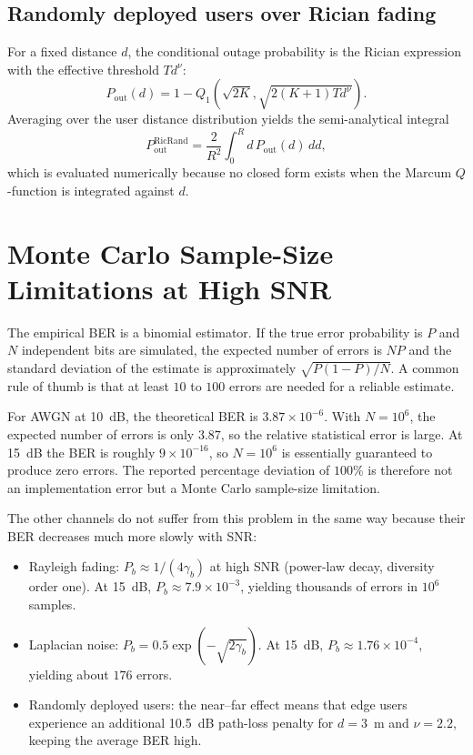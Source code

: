 \documentclass[12pt,a4paper]{article}
\begin{document}
\subsection{Randomly deployed users over Rician fading}
For a fixed distance $d$, the conditional outage probability is the Rician expression with the effective threshold $Td^{\nu}$:
\begin{equation}
    P_{\text{out}}(d)=1-Q_1\!\left(\sqrt{2K},\sqrt{2(K+1)Td^{\nu}}\right).
\end{equation}
Averaging over the user distance distribution yields the semi-analytical integral
\begin{equation}
    P_{\text{out}}^{\text{RicRand}}
    =\frac{2}{R^2}\int_0^R d\,P_{\text{out}}(d)\,dd,
\end{equation}
which is evaluated numerically because no closed form exists when the Marcum $Q$-function is integrated against $d$.

\section{Monte Carlo Sample-Size Limitations at High SNR}\label{app:sample}
The empirical BER is a binomial estimator. If the true error probability is $P$ and $N$ independent bits are simulated, the expected number of errors is $NP$ and the standard deviation of the estimate is approximately $\sqrt{P(1-P)/N}$. A common rule of thumb is that at least $10$ to $100$ errors are needed for a reliable estimate.

For AWGN at \SI{10}{dB}, the theoretical BER is $3.87\times 10^{-6}$. With $N=10^6$, the expected number of errors is only $3.87$, so the relative statistical error is large. At \SI{15}{dB} the BER is roughly $9\times 10^{-16}$, so $N=10^6$ is essentially guaranteed to produce zero errors. The reported percentage deviation of $100\%$ is therefore not an implementation error but a Monte Carlo sample-size limitation.

The other channels do not suffer from this problem in the same way because their BER decreases much more slowly with SNR:
\begin{itemize}
    \item Rayleigh fading: $P_b\approx 1/(4\gamma_b)$ at high SNR (power-law decay, diversity order one). At \SI{15}{dB}, $P_b\approx 7.9\times 10^{-3}$, yielding thousands of errors in $10^6$ samples.
    \item Laplacian noise: $P_b=0.5\exp(-\sqrt{2\gamma_b})$. At \SI{15}{dB}, $P_b\approx 1.76\times 10^{-4}$, yielding about $176$ errors.
    \item Randomly deployed users: the near--far effect means that edge users experience an additional \SI{10.5}{dB} path-loss penalty for $d=3$~m and $\nu=2.2$, keeping the average BER high.
\end{itemize}
\end{document}
